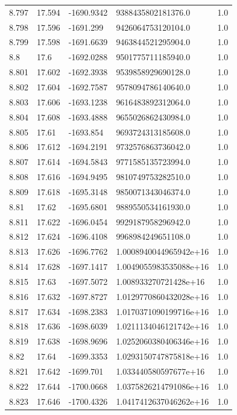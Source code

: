 \begin{tabular}{lllll}
8.797 & 17.594 & -1690.9342 & 9388435802181376.0 & 1.0 \\
8.798 & 17.596 & -1691.299 & 9426064753120104.0 & 1.0 \\
8.799 & 17.598 & -1691.6639 & 9463844521295904.0 & 1.0 \\
8.8 & 17.6 & -1692.0288 & 9501775711185940.0 & 1.0 \\
8.801 & 17.602 & -1692.3938 & 9539858929690128.0 & 1.0 \\
8.802 & 17.604 & -1692.7587 & 9578094786140640.0 & 1.0 \\
8.803 & 17.606 & -1693.1238 & 9616483892312064.0 & 1.0 \\
8.804 & 17.608 & -1693.4888 & 9655026862430984.0 & 1.0 \\
8.805 & 17.61 & -1693.854 & 9693724313185608.0 & 1.0 \\
8.806 & 17.612 & -1694.2191 & 9732576863736042.0 & 1.0 \\
8.807 & 17.614 & -1694.5843 & 9771585135723994.0 & 1.0 \\
8.808 & 17.616 & -1694.9495 & 9810749753282510.0 & 1.0 \\
8.809 & 17.618 & -1695.3148 & 9850071343046374.0 & 1.0 \\
8.81 & 17.62 & -1695.6801 & 9889550534161930.0 & 1.0 \\
8.811 & 17.622 & -1696.0454 & 9929187958296942.0 & 1.0 \\
8.812 & 17.624 & -1696.4108 & 9968984249651108.0 & 1.0 \\
8.813 & 17.626 & -1696.7762 & 1.0008940044965942e+16 & 1.0 \\
8.814 & 17.628 & -1697.1417 & 1.0049055983535088e+16 & 1.0 \\
8.815 & 17.63 & -1697.5072 & 1.008933270721428e+16 & 1.0 \\
8.816 & 17.632 & -1697.8727 & 1.0129770860432028e+16 & 1.0 \\
8.817 & 17.634 & -1698.2383 & 1.0170371090199716e+16 & 1.0 \\
8.818 & 17.636 & -1698.6039 & 1.0211134046121742e+16 & 1.0 \\
8.819 & 17.638 & -1698.9696 & 1.0252060380406346e+16 & 1.0 \\
8.82 & 17.64 & -1699.3353 & 1.0293150747875818e+16 & 1.0 \\
8.821 & 17.642 & -1699.701 & 1.033440580597677e+16 & 1.0 \\
8.822 & 17.644 & -1700.0668 & 1.0375826214791086e+16 & 1.0 \\
8.823 & 17.646 & -1700.4326 & 1.0417412637046262e+16 & 1.0 \\

\end{tabular}
